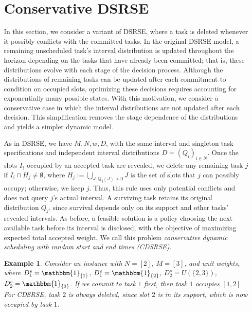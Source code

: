 \documentclass{article}
\newtheorem{example}[theorem]{Example}
\begin{document}
\section{Conservative DSRSE}
\label{section:Conservatice DSRSE}

In this section, we consider a {variant} of DSRSE, where a task is deleted whenever it possibly conflicts with the committed tasks. %
In the original DSRSE model, a remaining unscheduled task's {interval distribution is updated} throughout the horizon depending on the tasks that have already been committed; 
that is, these distributions evolve with each stage of the decision process. 
{Although the distributions of remaining tasks can be updated after each commitment to condition on occupied slots, optimizing these decisions requires accounting for exponentially many possible states.}
With this motivation, we consider a conservative case in which the {interval distributions} are not updated after each decision. 
This simplification removes the stage dependence of the distributions and yields a simpler dynamic model.

As in DSRSE, we have $M,N,w,D${\unskip, with the same interval and singleton task specifications and independent interval distributions $D=(Q_i)_{i\in N}$. 
Once the slots $I_i$ occupied by an accepted task are revealed}, we delete any remaining task $j$ if  {$I_i\cap H_j \neq\emptyset$, where $H_j:=\bigcup_{J:Q_j(J)>0}J$ is the set of slots that $j$ can possibly occupy}; 
otherwise, we keep $j$.  {Thus, this rule uses only potential conflicts and does not query $j$'s actual interval. A surviving task retains its original distribution $Q_j$, since survival depends only on its support and other tasks' revealed intervals. 
As before, a feasible solution is a policy choosing the next available task before its interval is disclosed, with the objective of maximizing expected total accepted weight}.
We call this problem \emph{conservative dynamic scheduling with random start and end times (CDSRSE)}.

\begin{example}
\label{eg:2}
Consider an instance with $N=[2]$, $M=[3]$, and unit weights, where $D_1^s=\mathbbm{1}_{\{1\}}$, $D_1^e=\mathbbm{1}_{\{2\}}$, $D_2^s=U(\{2,3\})$, $D_2^e=\mathbbm{1}_{\{3\}}$. 
If we commit to task $1$ first, then task $1$ occupies $[1,2]$.
For CDSRSE, task $2$ is always deleted, since {slot} $2$ is in its support, which is now occupied by task $1$.
\end{example}
\end{document}
